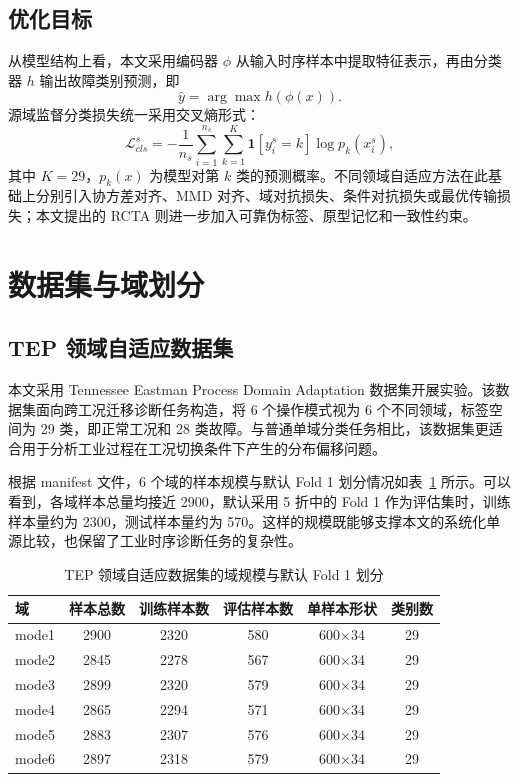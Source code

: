 \subsection{优化目标}
从模型结构上看，本文采用编码器 $\phi$ 从输入时序样本中提取特征表示，再由分类器 $h$ 输出故障类别预测，即
\begin{equation}
\hat{y}= \arg\max h(\phi(x)).
\end{equation}
源域监督分类损失统一采用交叉熵形式：
\begin{equation}
\mathcal{L}_{cls}^s=
-\frac{1}{n_s}\sum_{i=1}^{n_s}\sum_{k=1}^{K}
\mathbf{1}[y_i^s=k]\log p_k(x_i^s),
\end{equation}
其中 $K=29$，$p_k(x)$ 为模型对第 $k$ 类的预测概率。不同领域自适应方法在此基础上分别引入协方差对齐、MMD 对齐、域对抗损失、条件对抗损失或最优传输损失；本文提出的 RCTA 则进一步加入可靠伪标签、原型记忆和一致性约束。

\section{数据集与域划分}
\subsection{TEP 领域自适应数据集}
本文采用 Tennessee Eastman Process Domain Adaptation 数据集开展实验。该数据集面向跨工况迁移诊断任务构造，将 6 个操作模式视为 6 个不同领域，标签空间为 29 类，即正常工况和 28 类故障。与普通单域分类任务相比，该数据集更适合用于分析工业过程在工况切换条件下产生的分布偏移问题。

根据 manifest 文件，6 个域的样本规模与默认 Fold 1 划分情况如表~\ref{tab:dataset-stats} 所示。可以看到，各域样本总量均接近 2900，默认采用 5 折中的 Fold 1 作为评估集时，训练样本量约为 2300，测试样本量约为 570。这样的规模既能够支撑本文的系统化单源比较，也保留了工业时序诊断任务的复杂性。

\begin{table}[htbp]
\centering
\caption{TEP 领域自适应数据集的域规模与默认 Fold 1 划分}
\label{tab:dataset-stats}
\begin{tabular}{lccccc}
\hline
域 & 样本总数 & 训练样本数 & 评估样本数 & 单样本形状 & 类别数 \\
\hline
mode1 & 2900 & 2320 & 580 & 600$\times$34 & 29 \\
mode2 & 2845 & 2278 & 567 & 600$\times$34 & 29 \\
mode3 & 2899 & 2320 & 579 & 600$\times$34 & 29 \\
mode4 & 2865 & 2294 & 571 & 600$\times$34 & 29 \\
mode5 & 2883 & 2307 & 576 & 600$\times$34 & 29 \\
mode6 & 2897 & 2318 & 579 & 600$\times$34 & 29 \\
\hline
\end{tabular}
\end{table}

